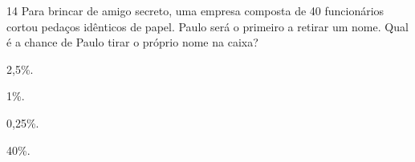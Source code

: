 











\num{14} Para brincar de amigo secreto, uma empresa composta de 40
funcionários cortou pedaços idênticos de papel. Paulo será o primeiro a
retirar um nome. Qual é a chance de Paulo tirar o próprio nome na caixa?

\begin{escolha}
\item 2,5\%.
\item 1\%.
\item 0,25\%.
\item 40\%.
\end{escolha}







